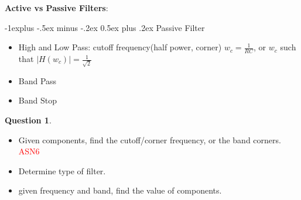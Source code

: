 \documentclass[10pt,landscape]{article}
\makeatletter
\renewcommand{\subsection}{\@startsection{subsection}{2}{0mm}%
                                {-1explus -.5ex minus -.2ex}%
                                {0.5ex plus .2ex}%
                                {\normalfont\normalsize\bfseries}}
\newcommand\todo[1]{\textcolor{red}{#1}}
\theoremstyle{definition}
\newtheorem*{question}{Question}
\theoremstyle{remark}
\makeatother
\begin{document}
\begin{multicols}{3}
\textbf{Active vs Passive Filters}: 
\begin{table}[H]
\centering
{}
\end{table}

\subsection{Passive Filter}
\begin{itemize}[noitemsep,nolistsep]
    \item High and Low Pass: cutoff frequency(half power, corner) $w_c = \frac{1}{RC}$, or $w_c$ such that $|H(w_c)| = \frac{1}{\sqrt{2}}$
    \item Band Pass
    \item Band Stop
\end{itemize}

\begin{question} \mbox{} \\
\begin{itemize}[noitemsep,nolistsep]
    \item Given components, find the cutoff/corner frequency, or the band corners. \todo{ASN6}
    \item Determine type of filter. 
    \item given frequency and band, find the value of components. 
\end{itemize}
\end{question}


\end{multicols}
\end{document}

